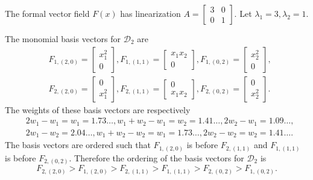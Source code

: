 \documentclass{article}
\theoremstyle{definition}
\begin{document}
The formal vector field $F(x)$ has linearization $A=\begin{bmatrix}3&0\\0&1\end{bmatrix}$. Let $\lambda_1=3,\lambda_2=1$.

The monomial basis vectors for $\mathscr{D}_2$ are
\[
\begin{split}
&F_{1,(2,0)}=\begin{bmatrix}x_1^2\\0\end{bmatrix},
F_{1,(1,1)}=\begin{bmatrix}x_1 x_2\\0\end{bmatrix},
F_{1,(0,2)}=\begin{bmatrix}x_2^2\\0\end{bmatrix},\\
&F_{2,(2,0)}=\begin{bmatrix}0\\ x_1^2\end{bmatrix},
F_{2,(1,1)}=\begin{bmatrix}0\\ x_1 x_2\end{bmatrix},
F_{2,(0,2)}=\begin{bmatrix}0\\ x_2^2\end{bmatrix}.
\end{split}
\]
The weights of these basis vectors are respectively
\[
\begin{split}
&2w_1-w_1=w_1=1.73\ldots, w_1+w_2-w_1=w_2=1.41\ldots,
2w_2-w_1=1.09\ldots,\\
&2w_1-w_2=2.04\ldots,
w_1+w_2-w_2=w_1=1.73\ldots,
2w_2-w_2=w_2=1.41\ldots.
\end{split}
\]
The basis vectors are ordered such that $F_{1,(2,0)}$ is before $F_{2,(1,1)}$
and $F_{1,(1,1)}$ is before $F_{2,(0,2)}$. Therefore the ordering of the basis vectors for $\mathscr{D}_2$
is
\begin{equation}
\label{orderedbasisD2}
F_{2,(2,0)}>F_{1,(2,0)}>F_{2,(1,1)}>F_{1,(1,1)}>F_{2,(0,2)}>F_{1,(0,2)}.
\end{equation}
\end{document}
